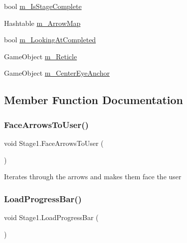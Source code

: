 \begin{DoxyCompactItemize}
\item 
bool \mbox{\hyperlink{class_stage1_ac4aaa3ab55eca6e4e561a51c7257d246}{m\+\_\+\+Is\+Stage\+Complete}}
\item 
Hashtable \mbox{\hyperlink{class_stage1_a013cab53ec598101d39197f1eae83e44}{m\+\_\+\+Arrow\+Map}}
\item 
bool \mbox{\hyperlink{class_stage1_ae2f93b4706065e7891ece3becaeef9cd}{m\+\_\+\+Looking\+At\+Completed}}
\item 
Game\+Object \mbox{\hyperlink{class_stage1_a6ffff0ae9f4d8ba81069bbec5fa8b899}{m\+\_\+\+Reticle}}
\item 
Game\+Object \mbox{\hyperlink{class_stage1_a61914e3464e7a11b41cdf5fb2516a619}{m\+\_\+\+Center\+Eye\+Anchor}}
\end{DoxyCompactItemize}


\subsection{Member Function Documentation}
\mbox{\label{class_stage1_a6792b3b46499c0c5a6bf63031f6783b7}} 
\subsubsection{\texorpdfstring{Face\+Arrows\+To\+User()}{FaceArrowsToUser()}}
{\footnotesize\ttfamily void Stage1.\+Face\+Arrows\+To\+User (\begin{DoxyParamCaption}{ }\end{DoxyParamCaption})\hspace{0.3cm}{\ttfamily [private]}}



Iterates through the arrows and makes them face the user 

\mbox{\label{class_stage1_af625f5fcec1c9ac7a6fd6d74e437c13e}} 
\subsubsection{\texorpdfstring{Load\+Progress\+Bar()}{LoadProgressBar()}}
{\footnotesize\ttfamily void Stage1.\+Load\+Progress\+Bar (\begin{DoxyParamCaption}{ }\end{DoxyParamCaption})\hspace{0.3cm}{\ttfamily [private]}}



